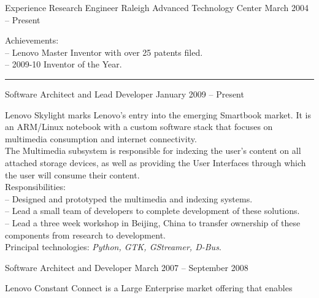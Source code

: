 \documentclass[letterpaper, 11pt]{article}
\begin{document}
    \begin{resume}
        \begin{category}{Experience}
                                         {Research Engineer}
                     {Raleigh Advanced Technology Center} {March 2004 -- Present}
            \par
            Achievements: \\
            -- Lenovo Master Inventor with over 25 patents filed. \\
            -- 2009-10 Inventor of the Year. \\
            \rule{\textwidth}{1pt}
            \begin{block}
                 {Software Architect and Lead Developer}
                         { }               {January 2009 -- Present}
                \par
                Lenovo Skylight marks Lenovo's entry into the emerging Smartbook market.
                It is an ARM/Linux notebook with a custom software stack that focuses
                on multimedia consumption and internet connectivity.
                \\[1ex]
                The Multimedia subsystem is responsible for indexing the user's content on all
                attached storage devices, as well as providing the User Interfaces through which
                the user will consume their content.
                \\[1ex]
                Responsibilities: \\
                -- Designed and prototyped the multimedia and indexing systems. \\
                -- Lead a small team of developers to complete development of these solutions. \\
                -- Lead a three week workshop in Beijing, China to transfer ownership of these components from research to development.
                \\[1ex]
                Principal technologies: \emph{Python, GTK, GStreamer, D-Bus}.
                \smallskip
            \end{block}
            \begin{block}
                 {Software Architect and Developer}
                         { }                       {March 2007 -- September 2008}
                \par
                Lenovo Constant Connect is a Large Enterprise market offering that enables

\end{block}
\end{category}
\end{resume}
\end{document}
